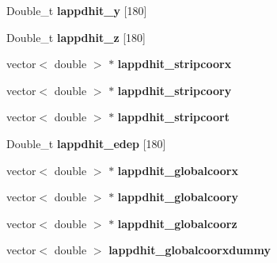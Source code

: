 \begin{DoxyCompactItemize}
\item 
\hypertarget{classLAPPDTree_a2bc97b493024b71430528a71c2339ec7}{
Double\_\-t {\bfseries lappdhit\_\-y} \mbox{[}180\mbox{]}}
\label{classLAPPDTree_a2bc97b493024b71430528a71c2339ec7}

\item 
\hypertarget{classLAPPDTree_a73e138836f63b843c99fbe3951f7e504}{
Double\_\-t {\bfseries lappdhit\_\-z} \mbox{[}180\mbox{]}}
\label{classLAPPDTree_a73e138836f63b843c99fbe3951f7e504}

\item 
\hypertarget{classLAPPDTree_aa5f1d299a73e165905b798a925206de5}{
vector$<$ double $>$ $\ast$ {\bfseries lappdhit\_\-stripcoorx}}
\label{classLAPPDTree_aa5f1d299a73e165905b798a925206de5}

\item 
\hypertarget{classLAPPDTree_a1a9420e83fa6ac964448bd89fb613248}{
vector$<$ double $>$ $\ast$ {\bfseries lappdhit\_\-stripcoory}}
\label{classLAPPDTree_a1a9420e83fa6ac964448bd89fb613248}

\item 
\hypertarget{classLAPPDTree_a07b7a60f594d559022c75cc8962a673e}{
vector$<$ double $>$ $\ast$ {\bfseries lappdhit\_\-stripcoort}}
\label{classLAPPDTree_a07b7a60f594d559022c75cc8962a673e}

\item 
\hypertarget{classLAPPDTree_a361c88caa35c7b75c6625d1726fd3116}{
Double\_\-t {\bfseries lappdhit\_\-edep} \mbox{[}180\mbox{]}}
\label{classLAPPDTree_a361c88caa35c7b75c6625d1726fd3116}

\item 
\hypertarget{classLAPPDTree_abbf80a1da763ec467ead614fd4289718}{
vector$<$ double $>$ $\ast$ {\bfseries lappdhit\_\-globalcoorx}}
\label{classLAPPDTree_abbf80a1da763ec467ead614fd4289718}

\item 
\hypertarget{classLAPPDTree_a4d4353d05db2632541d8a34b825cc5e8}{
vector$<$ double $>$ $\ast$ {\bfseries lappdhit\_\-globalcoory}}
\label{classLAPPDTree_a4d4353d05db2632541d8a34b825cc5e8}

\item 
\hypertarget{classLAPPDTree_a44dc4554d5ea50fe0043d6d5e83292d4}{
vector$<$ double $>$ $\ast$ {\bfseries lappdhit\_\-globalcoorz}}
\label{classLAPPDTree_a44dc4554d5ea50fe0043d6d5e83292d4}

\item 
\hypertarget{classLAPPDTree_a842bd00c916ff704c337885e944a2597}{
vector$<$ double $>$ {\bfseries lappdhit\_\-globalcoorxdummy}}
\label{classLAPPDTree_a842bd00c916ff704c337885e944a2597}


\end{DoxyCompactItemize}
